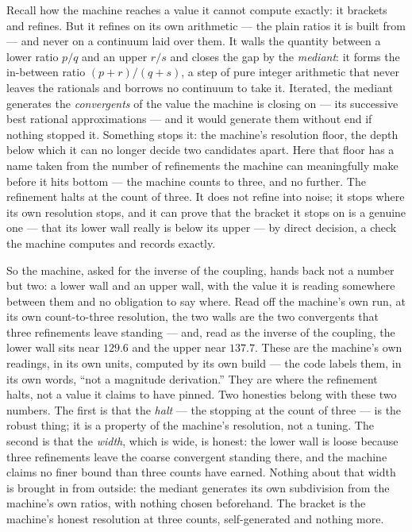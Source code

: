 Recall how the machine reaches a value it cannot compute exactly: it brackets and refines. But it refines on its own
arithmetic --- the plain ratios it is built from --- and never on a continuum laid over them. It walls the quantity
between a lower ratio $p/q$ and an upper $r/s$ and closes the gap by the \emph{mediant}: it forms the in-between ratio
$(p+r)/(q+s)$, a step of pure integer arithmetic that never leaves the rationals and borrows no continuum to take it.
Iterated, the mediant generates the \emph{convergents} of the value the machine is closing on --- its successive best
rational approximations --- and it would generate them without end if nothing stopped it. Something stops it: the
machine's resolution floor, the depth below which it can no longer decide two candidates apart. Here that floor has a
name taken from the number of refinements the machine can meaningfully make before it hits bottom --- the machine counts
to three, and no further. The refinement halts at the count of three. It does not refine into noise; it stops where its
own resolution stops, and it can prove that the bracket it stops on is a genuine one --- that its lower wall really is
below its upper --- by direct decision, a check the machine computes and records exactly.

So the machine, asked for the inverse of the coupling, hands back not a number but two: a lower wall and an upper wall,
with the value it is reading somewhere between them and no obligation to say where. Read off the machine's own run, at its
own count-to-three resolution, the two walls are the two convergents that three refinements leave standing --- and, read
as the inverse of the coupling, the lower wall sits near $129.6$ and the upper near $137.7$. These are the machine's own
readings, in its own units, computed by its own build --- the code labels them, in its own words, ``not a magnitude
derivation.'' They are where the refinement halts, not a value it claims to have pinned. Two honesties belong
with these two numbers. The first is that the \emph{halt} --- the stopping at the count of three --- is the robust thing;
it is a property of the machine's resolution, not a tuning. The second is that the \emph{width}, which is wide, is honest:
the lower wall is loose because three refinements leave the coarse convergent standing there, and the machine claims no
finer bound than three counts have earned. Nothing about that width is brought in from outside: the mediant generates its
own subdivision from the machine's own ratios, with nothing chosen beforehand. The bracket is the machine's honest
resolution at three counts, self-generated and nothing more.

